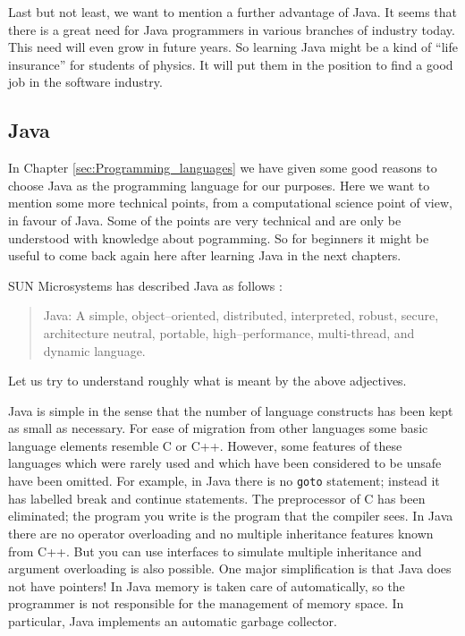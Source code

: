 Last but not least, we want to mention a further advantage of Java. It seems
\cite[]{bigbucks} that there is  a great need for Java programmers in 
various branches of industry today. This need will even grow in future 
years. So learning Java might be a kind of ``life insurance'' for students of 
physics. It will put them in the position to find a good  job in the
software industry.


\subsection{Java}
\label{sec:Java}

In Chapter \ref{sec:Programming_languages} we have given
some good reasons to choose Java as the programming language
for our purposes. Here we want to mention some more technical points, from a 
computational science point of view, in favour of Java. Some of the points
are very technical and are only be understood with knowledge about
pogramming. So for beginners it might be useful to come back again here
after learning Java in the next chapters.

SUN Microsystems has described Java as follows \cite[]{javanutshell}:
\begin{quote}
Java: A simple, object--oriented, distributed, interpreted, robust, secure,
architecture neutral, portable, high--performance, multi-thread, and dynamic 
language.
\end{quote}
Let us try to understand roughly what is meant by the above adjectives.

Java is simple in the sense that the number of language constructs has been 
kept as small as necessary. For ease of migration from other languages some
basic language elements resemble C or C++. However, some features of these 
languages which were rarely used and which have been considered to be unsafe 
have been omitted. For example, in Java there is no \verb|goto|
 statement; instead 
it has labelled break and continue statements. The preprocessor of C has been 
eliminated; the program you write is the program that the compiler sees. In 
Java there are no  operator overloading and no multiple inheritance 
features known from C++. But you can use interfaces to simulate 
multiple inheritance and argument overloading is also possible.
One major simplification is that Java does not have pointers!
In Java memory is taken care of automatically, so the programmer is not responsible 
for the management  of memory space. In particular, Java implements an 
automatic  garbage collector.

